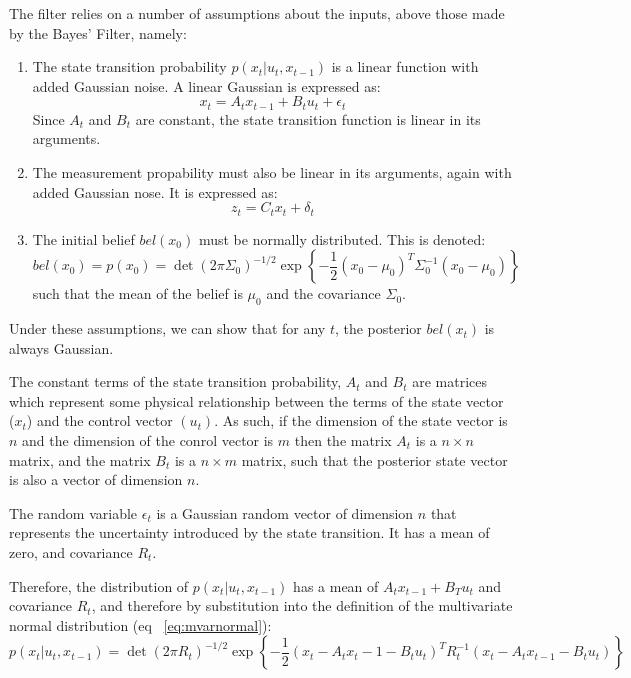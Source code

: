 \documentclass[english]{article}
\begin{document}
The filter relies on a number of assumptions about the inputs, above those made by the Bayes' Filter, namely:
\begin{enumerate}
	\item The state transition probability $p(x_t | u_t,x_{t-1})$ is a linear function with added Gaussian noise. A linear Gaussian is expressed as:
		\begin{equation}
			x_t = A_t x_{t-1} + B_t u_t + \epsilon _t
		\end{equation}
		Since $A_t$ and $B_t$ are constant, the state transition function is linear in its arguments.
	\item The measurement propability must also be linear in its arguments, again with added Gaussian nose. It is expressed as:
		\begin{equation}
			z_t = C_t x_t + \delta _t
		\end{equation}
	\item The initial belief $bel(x_0)$ must be normally distributed. This is denoted:
		\begin{equation}
			bel(x_0) = p(x_0) = \det(2 \pi \Sigma_0)^{-1/2} \exp\left\{-\frac{1}{2}(x_0-\mu_0)^T \Sigma_0^{-1}(x_0-\mu_0)\right\}
		\end{equation}
		such that the mean of the belief is $\mu_0$ and the covariance $\Sigma_0$.
\end{enumerate}
Under these assumptions, we can show that for any $t$, the posterior $bel(x_t)$ is always Gaussian.

The constant terms of the state transition probability, $A_t$ and $B_t$ are matrices which represent some physical relationship between the terms of the state vector ($x_t$) and the control vector $(u_t)$. As such, if the dimension of the state vector is $n$ and the dimension of the conrol vector is $m$ then the matrix $A_t$ is a $n \times n$ matrix, and the matrix $B_t$ is a $n \times m$ matrix, such that the posterior state vector is also a vector of dimension $n$. 

The random variable $\epsilon _t$ is a Gaussian random vector of dimension $n$ that represents the uncertainty introduced by the state transition. It has a mean of zero, and covariance $R_t$.

Therefore, the distribution of $p(x_t | u_t, x_{t-1})$ has a mean of $A_t x_{t-1} + B_T u_t$ and covariance $R_t$, and therefore by substitution into the definition of the multivariate normal distribution (eq ~\ref{eq:mvarnormal}):
\begin{equation}
	p(x_t | u_t, x_{t-1}) = \det(2 \pi R_t)^{-1/2} \exp\left\{-\frac{1}{2}(x_t - A_t x_t-1 - B_t u_t)^T R_t^{-1}(x_t - A_t x_{t-1} - B_t u_t)\right\}
\end{equation}
\end{document}
